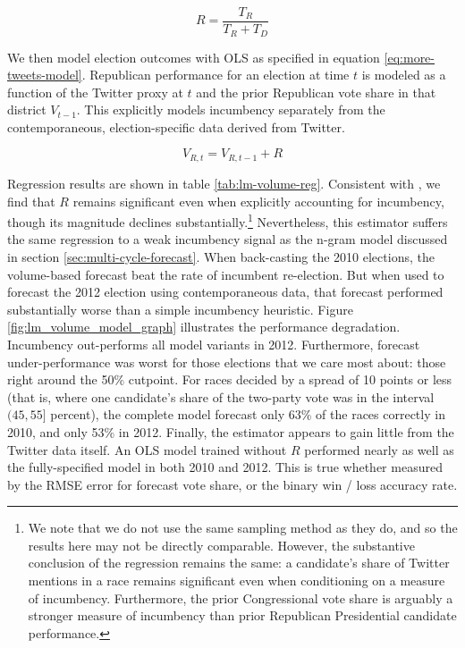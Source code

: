 \documentclass{sig-alternate-2013}
\begin{document}
\begin{equation}
  \label{eq:more-tweets}
  R = \frac{T_R}{T_R + T_D}
\end{equation}

We then model election outcomes with OLS as specified in
equation \ref{eq:more-tweets-model}. Republican performance for an
election at time $t$ is modeled as a function of the Twitter proxy at
$t$ and the prior Republican vote share in that district $V_{t-1}$. This
explicitly models incumbency separately from the contemporaneous,
election-specific data derived from Twitter. 

\begin{equation}
  \label{eq:more-tweets-model}
  V_{R, t} = V_{R, t-1} + R
\end{equation}

Regression results are shown in table
\ref{tab:lm-volume-reg}. Consistent with \cite{digrazia2013}, we find
that $R$ remains significant even when explicitly accounting for
incumbency, though its magnitude declines substantially.\footnote{We
note that we do not use the same sampling method as they do, and so
the results here may not be directly comparable. However, the
substantive conclusion of the regression remains the same: a
candidate's share of Twitter mentions in a race remains significant
even when conditioning on a measure of incumbency. Furthermore, the
prior Congressional vote share is arguably a stronger measure of
incumbency than prior Republican Presidential candidate performance.}
Nevertheless, this estimator suffers the same regression to a weak
incumbency signal as the n-gram model discussed in section
\ref{sec:multi-cycle-forecast}. When back-casting the 2010 elections,
the volume-based forecast beat the rate of incumbent re-election. But
when used to forecast the 2012 election using contemporaneous data,
that forecast performed substantially worse than a simple incumbency
heuristic. Figure \ref{fig:lm_volume_model_graph} illustrates the
performance degradation. Incumbency out-performs all model variants in
2012. Furthermore, forecast under-performance was worst for those
elections that we care most about: those right around the 50\%
cutpoint. For races decided by a spread of 10 points or less (that is,
where one candidate's share of the two-party vote was in the interval
$(45, 55]$ percent), the complete model forecast only 63\% of the races
correctly in 2010, and only 53\% in 2012. Finally, the estimator
appears to gain little from the Twitter data itself. An OLS model
trained without $R$ performed nearly as well as the fully-specified
model in both 2010 and 2012. This is true whether measured by the RMSE
error for forecast vote share, or the binary win / loss accuracy rate.
\end{document}
